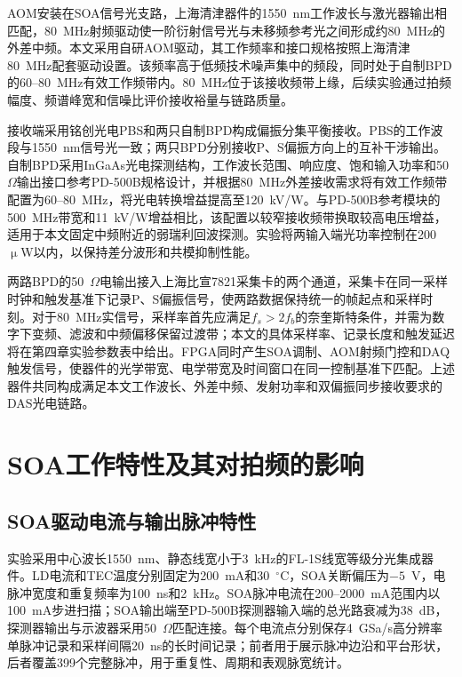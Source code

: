 AOM安装在SOA信号光支路，上海清津器件的1550~nm工作波长与激光器输出相匹配，80~MHz射频驱动使一阶衍射信号光与未移频参考光之间形成约80~MHz的外差中频。本文采用自研AOM驱动，其工作频率和接口规格按照上海清津80~MHz配套驱动设置。该频率高于低频技术噪声集中的频段，同时处于自制BPD的60--80~MHz有效工作频带内。80~MHz位于该接收频带上缘，后续实验通过拍频幅度、频谱峰宽和信噪比评价接收裕量与链路质量。

接收端采用铭创光电PBS和两只自制BPD构成偏振分集平衡接收。PBS的工作波段与1550~nm信号光一致；两只BPD分别接收P、S偏振方向上的互补干涉输出。自制BPD采用InGaAs光电探测结构，工作波长范围、响应度、饱和输入功率和50~$\Omega$输出接口参考PD-500B规格设计，并根据80~MHz外差接收需求将有效工作频带配置为60--80~MHz，将光电转换增益提高至120~kV/W。与PD-500B参考模块的500~MHz带宽和11~kV/W增益相比，该配置以较窄接收频带换取较高电压增益，适用于本文固定中频附近的弱瑞利回波探测。实验将两输入端光功率控制在200~$\upmu$W以内，以保持差分波形和共模抑制性能。

两路BPD的50~$\Omega$电输出接入上海比宣7821采集卡的两个通道，采集卡在同一采样时钟和触发基准下记录P、S偏振信号，使两路数据保持统一的帧起点和采样时刻。对于80~MHz实信号，采样率首先应满足$f_s>2f_b$的奈奎斯特条件，并需为数字下变频、滤波和中频偏移保留过渡带；本文的具体采样率、记录长度和触发延迟将在第四章实验参数表中给出。FPGA同时产生SOA调制、AOM射频门控和DAQ触发信号，使器件的光学带宽、电学带宽及时间窗口在同一控制基准下匹配。上述器件共同构成满足本文工作波长、外差中频、发射功率和双偏振同步接收要求的DAS光电链路。

\section{SOA工作特性及其对拍频的影响}

\subsection{SOA驱动电流与输出脉冲特性}

实验采用中心波长1550~nm、静态线宽小于3~kHz的FL-1S线宽等级分光集成器件。LD电流和TEC温度分别固定为200~mA和30~$^\circ$C，SOA关断偏压为$-5$~V，电脉冲宽度和重复频率为100~ns和2~kHz。SOA脉冲电流在200--2000~mA范围内以100~mA步进扫描；SOA输出端至PD-500B探测器输入端的总光路衰减为38~dB，探测器输出与示波器采用50~$\Omega$匹配连接。每个电流点分别保存4~GSa/s高分辨率单脉冲记录和采样间隔20~ns的长时间记录；前者用于展示脉冲边沿和平台形状，后者覆盖399个完整脉冲，用于重复性、周期和表观脉宽统计。

